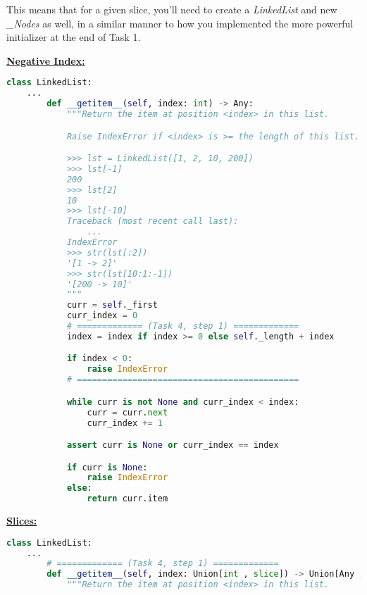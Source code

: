 \documentclass[12pt]{article}
\begin{document}
\bigskip

\noindent This means that for a given slice, you’ll need to create a \textit{LinkedList} and new
\textit{\_Nodes} as well, in a similar manner to how you implemented the more
powerful initializer at the end of Task 1.

\bigskip

\begin{mdframed}

\underline{\textbf{Negative Index:}}

\begin{lstlisting}[language=python]
    class LinkedList:
    ...
        def __getitem__(self, index: int) -> Any:
            """Return the item at position <index> in this list.

            Raise IndexError if <index> is >= the length of this list.

            >>> lst = LinkedList([1, 2, 10, 200])
            >>> lst[-1]
            200
            >>> lst[2]
            10
            >>> lst[-10]
            Traceback (most recent call last):
                ...
            IndexError
            >>> str(lst[:2])
            '[1 -> 2]'
            >>> str(lst[10:1:-1])
            '[200 -> 10]'
            """
            curr = self._first
            curr_index = 0
            # ============= (Task 4, step 1) =============
            index = index if index >= 0 else self._length + index

            if index < 0:
                raise IndexError
            # ============================================

            while curr is not None and curr_index < index:
                curr = curr.next
                curr_index += 1

            assert curr is None or curr_index == index

            if curr is None:
                raise IndexError
            else:
                return curr.item

\end{lstlisting}

\bigskip

\underline{\textbf{Slices:}}

\bigskip

\begin{lstlisting}[language=python]
    class LinkedList:
    ...
        # ============= (Task 4, step 1) =============
        def __getitem__(self, index: Union[int , slice]) -> Union[Any , LinkedList]:
            """Return the item at position <index> in this list.


\end{lstlisting}
\end{mdframed}
\end{document}
